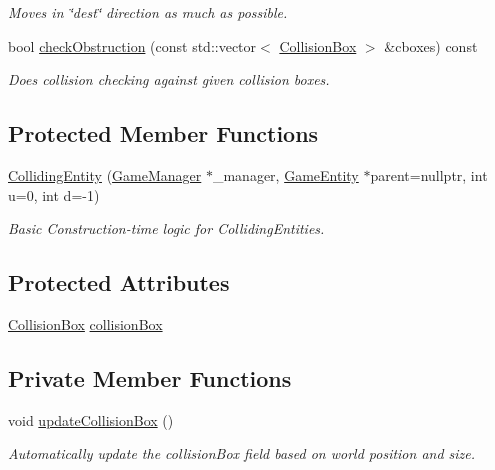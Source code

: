 \begin{DoxyCompactItemize}
\begin{DoxyCompactList}\small\item\em Moves in \char`\"{}dest\char`\"{} direction as much as possible. \end{DoxyCompactList}\item 
bool \mbox{\hyperlink{class_colliding_entity_a62cd7977ea32bbc4665fcc498c1ade2e}{check\+Obstruction}} (const std\+::vector$<$ \mbox{\hyperlink{class_collision_box}{Collision\+Box}} $>$ \&cboxes) const
\begin{DoxyCompactList}\small\item\em Does collision checking against given collision boxes. \end{DoxyCompactList}\end{DoxyCompactItemize}
\subsection*{Protected Member Functions}
\begin{DoxyCompactItemize}
\item 
\mbox{\hyperlink{class_colliding_entity_a8ef11c275e4441743e0b6ce54784647f}{Colliding\+Entity}} (\mbox{\hyperlink{class_game_manager}{Game\+Manager}} $\ast$\+\_\+manager, \mbox{\hyperlink{class_game_entity}{Game\+Entity}} $\ast$parent=nullptr, int u=0, int d=-\/1)
\begin{DoxyCompactList}\small\item\em Basic Construction-\/time logic for Colliding\+Entities. \end{DoxyCompactList}\end{DoxyCompactItemize}
\subsection*{Protected Attributes}
\begin{DoxyCompactItemize}
\item 
\mbox{\hyperlink{class_collision_box}{Collision\+Box}} \mbox{\hyperlink{class_colliding_entity_ac69bc4c38d52f6201967640f3895a08f}{collision\+Box}}
\end{DoxyCompactItemize}
\subsection*{Private Member Functions}
\begin{DoxyCompactItemize}
\item 
\mbox{\label{class_colliding_entity_a259f5b1f26a10c94e6dad9cd891b803e}} 
void \mbox{\hyperlink{class_colliding_entity_a259f5b1f26a10c94e6dad9cd891b803e}{update\+Collision\+Box}} ()
\begin{DoxyCompactList}\small\item\em Automatically update the collision\+Box field based on world position and size. \end{DoxyCompactList}\end{DoxyCompactItemize}
